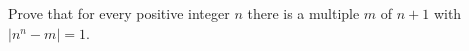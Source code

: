 Prove that for every positive integer $n$ there is a multiple $m$ of $n+1$ with $\left|n^n-m\right|=1$.
